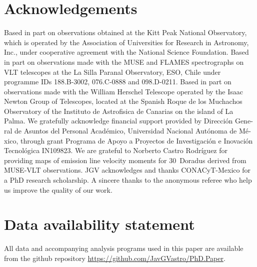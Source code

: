 \documentclass[fleqn,usenatbib, useAMS, a4paper]{mnras}
\begin{document}




\section*{Acknowledgements}

Based in part on observations obtained at the Kitt Peak National Observatory,
which is operated by the Association of Universities for Research in Astronomy, Inc.,
under cooperative agreement with the National Science Foundation.
Based in part on observations made with the MUSE and FLAMES spectrographs
on VLT telescopes at the La Silla Paranal Observatory, ESO, Chile
under programme IDs 188.B-3002, 076.C-0888 and 098.D-0211.
Based in part on observations made with the William Herschel Telescope
operated by the Isaac Newton Group of Telescopes,
located at the Spanish
\foreignlanguage{spanish}{Roque de los Muchachos}
Observatory of the
\foreignlanguage{spanish}{Instituto de Astrofisica de Canarias}
on the island of La Palma. 
We gratefully acknowledge financial support provided by
\foreignlanguage{spanish}{%
  Dirección General de Asuntos del Personal Académico,
  Universidad Nacional Autónoma de México},
through grant
\foreignlanguage{spanish}{%
  Programa de Apoyo a Proyectos de Investigación
  e Inovación Tecnológica}
IN109823.  
We are grateful to Norberto Castro Rodríguez for providing maps of emission line velocity moments
for 30~Doradus derived from MUSE-VLT observations.
JGV acknowledges and thanks CONACyT-Mexico for a PhD research scholarship. 
A sincere thanks to the anonymous referee who help us improve the quality of our work.


\section*{Data availability statement}
\label{sec:data-avail-stat}
All data and accompanying analysis programs used in this paper are available
from the github repository \url{https://github.com/JavGVastro/PhD.Paper}.
\end{document}
